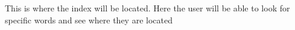 This is where the index will be located.
Here the user will be able to look for specific 
words and see where they are located